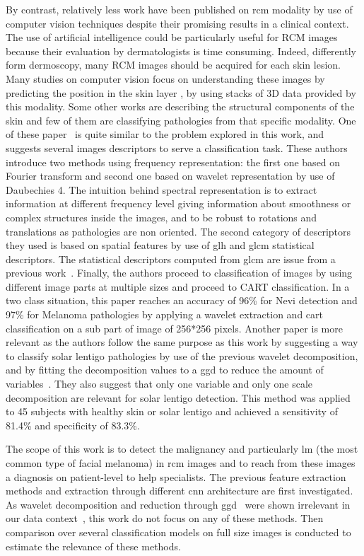 \documentclass[journal,article,submit,moreauthors,pdftex, applsci]{Definitions/mdpi}
\begin{document}
By contrast, relatively less work have been published on \ac{rcm} modality by use of computer vision techniques despite their promising results in a clinical context. The use of artificial intelligence could be particularly useful for RCM images because their evaluation by  dermatologists is time consuming. Indeed, differently form dermoscopy, many RCM images should be acquired for each skin lesion. Many studies on computer vision focus on understanding these images by predicting the position in the skin layer \cite{Somoza2014,Hames2016}, by using stacks of 3D data provided by this modality. Some other works are describing the structural components of the skin \cite{Gareau2010} and few of them are classifying pathologies from that specific modality. One of these paper~\cite{Wiltgen2008} is quite similar to the problem explored in this work, and suggests several images descriptors to serve a classification task. These authors introduce two methods using frequency representation: the first one based on Fourier transform and second one based on wavelet representation by use of Daubechies 4. The intuition behind spectral representation is to extract information at different frequency level giving information about smoothness or complex structures inside the images, and to be robust to rotations and translations as pathologies are non oriented. The second category of descriptors they used is based on spatial features by use of \ac{glh} and \ac{glcm} statistical descriptors. The statistical descriptors computed from \ac{glcm} are issue from a previous work~\cite{Haralick1973}. Finally, the authors proceed to classification of images by using different image parts at multiple sizes and proceed to CART classification. In a two class situation, this paper reaches an accuracy of 96\% for Nevi detection and 97\% for Melanoma pathologies by applying a wavelet extraction and \ac{cart} classification on a sub part of image of 256*256 pixels. Another paper is more relevant as the authors follow the same purpose as this work by suggesting a way to classify solar lentigo pathologies by use of the previous wavelet decomposition, and by fitting the decomposition values to a \ac{ggd} to reduce the amount of variables~\cite{Halimi2017a}. They also suggest that only one variable and only one scale decomposition are relevant for solar lentigo detection. This method was applied to 45 subjects with healthy skin or solar lentigo and achieved a sensitivity of 81.4\% and specificity of 83.3\%.\par
The scope of this work is to detect the malignancy and particularly \ac{lm} (the most common type of facial melanoma) in \ac{rcm} images and to reach from these images a diagnosis on patient-level to help specialists. The previous feature extraction methods and extraction through different \ac{cnn} architecture are first investigated. As wavelet decomposition and reduction through \ac{ggd}~\cite{Halimi2017a} were shown irrelevant in our data context~\cite{Cendre2019a}, this work do not focus on any of these methods. Then comparison over several classification models on full size images is conducted to estimate the relevance of these methods.\par
\end{document}
